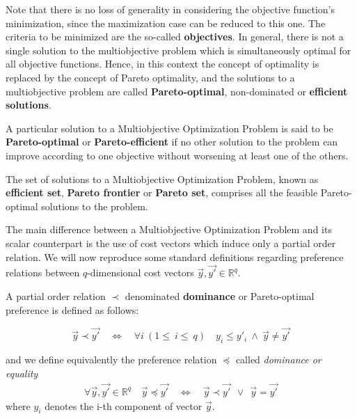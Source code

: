 Note that there is no loss of generality in considering the objective function's minimization, since the maximization case can be reduced to this one. The criteria to be minimized are the so-called \textbf{objectives}. In general, there is not a single solution to the multiobjective problem which is simultaneously optimal for all objective functions. Hence, in this context the concept of optimality is replaced by the concept of Pareto optimality, and the solutions to a multiobjective problem are called \textbf{Pareto-optimal}, non-dominated or \textbf{efficient solutions}. 

\begin{defi}\label{defi:Pareto-solution}
A particular solution to a Multiobjective Optimization Problem is said to be \textbf{Pareto-optimal} or \textbf{Pareto-efficient} if no other solution to the problem can improve according to one objective without worsening at least one of the others.
\end{defi}

\begin{defi}\label{defi:Pareto-set}
The set of solutions to a Multiobjective Optimization Problem, known as \textbf{efficient set}, \textbf{Pareto frontier} or \textbf{Pareto set}, comprises all the feasible Pareto-optimal solutions to the problem.
\end{defi}

The main difference between a Multiobjective Optimization Problem and its scalar counterpart is the use of cost vectors which induce only a partial order relation. We will now reproduce some standard definitions regarding preference relations between $q$-dimensional cost vectors $\vec y, \vec{y'} \in \mathbb{R}^q$.

\begin{defi}\label{chapMultiObjAlg:def:dominance}
A partial order relation $\prec$ denominated \textbf{dominance} or Pareto-optimal preference is defined as follows:

\begin{equation}
\vec{y} \prec \vec{y'} \quad
\Leftrightarrow \quad
\forall i \ (1\leq~i\leq~q) \quad y_i \leq y'_i \ \land \ \vec{y} \neq \vec{y'}
\end{equation}
\end{defi}
and we define equivalently the preference relation  $\preceq$ called \emph{dominance or equality}
\begin{eqnarray}
\forall \vec y,  \vec{y'} \in \mathbb{R}^q \quad
\vec y \preceq  \vec{y'} \quad
\Leftrightarrow \quad
\vec y \prec \vec{y'} \ \ \lor \ \ \vec y = \vec{y'}
\end{eqnarray}
where $y_i$ denotes the i-th component of vector $\vec y$.

